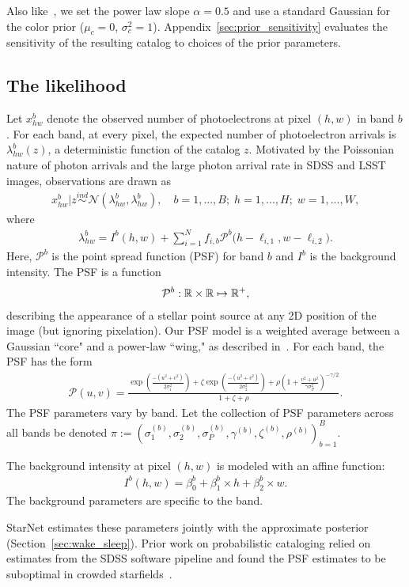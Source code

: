 Also like~\cite{Feder_2019}, we set the power law slope $\alpha = 0.5$ and use a standard Gaussian for the color prior ($\mu_c = 0$, $\sigma^2_c = 1$). 
Appendix~\ref{sec:prior_sensitivity} evaluates the 
sensitivity of the resulting catalog to choices of the prior parameters. 

\subsection{The likelihood}
Let $x_{hw}^b$ denote the observed number of photoelectrons at pixel $(h,w)$ in band $b$. 
For each band, at every pixel, the expected number of photoelectron arrivals is $\lambda^b_{hw}(z)$, a deterministic function of the catalog $z$. Motivated by the Poissonian nature of photon arrivals and 
the large photon arrival rate in SDSS and LSST images, 
observations are drawn as
\begin{align}
  x_{hw}^b | z \overset{ind}{\sim} \mathcal{N}(\lambda^b_{hw}, \lambda^b_{hw}),
  \quad 
  b = 1, ..., B; \;
  h = 1,..., H; \; 
  w = 1, ..., W, 
\end{align}
where 
\begin{align}
  \lambda^b_{hw} = I^{b}(h, w) + \sum_{i = 1}^N f_{i,b} \mathcal{P}^b\big(h - \ell_{i, 1}, w - \ell_{i, 2}\big).
  \label{eq:expected_intensity}
\end{align}
Here, $\mathcal{P}^b$ is the point spread function (PSF) for band $b$ and $I^{b}$ is the background intensity. The PSF is a function 
\begin{align}
\mathcal{P}^b : \mathbb{R} \times \mathbb{R} \mapsto \mathbb{R}^+,
\end{align}
describing the appearance of a stellar point source at any 2D position of the image (but ignoring pixelation). 
Our PSF model is a weighted average between a Gaussian ``core" and a power-law ``wing," as described in~\cite{Xin2018psf}. For each band, the PSF has the form
\begin{align}
    \mathcal{P}(u,v) = 
    \frac{\exp(\frac{-(u^2 + v^2)}{2\sigma_1^2}) + 
    \zeta \exp(\frac{-(u^2 + v^2)}{2\sigma_2^2}) + 
    \rho(1 + \frac{v^2 + u^2}{\gamma\sigma^2_P})^{-\gamma/2} }{1 + \zeta + \rho}.
\end{align}
The PSF parameters vary by band. Let the collection of PSF parameters across all bands be denoted $\pi := (\sigma_{1}^{(b)}, \sigma_{2}^{(b)}, \sigma_{P}^{(b)}, \gamma^{(b)}, \zeta^{(b)}, \rho^{(b)})_{b=1}^B$.

The background intensity at pixel $(h,w)$ is modeled with an affine function: 
\begin{align}
    I^{b}(h,w) = \beta_0^{b} + \beta_1^{b} \times h + \beta_2^{b} \times w.
\end{align}
The background parameters are specific to the band. 

StarNet estimates these parameters jointly with the approximate posterior (Section~\ref{sec:wake_sleep}). 
Prior work on probabilistic cataloging relied 
on estimates from the SDSS software pipeline and found the PSF estimates to be suboptimal in crowded starfields~\cite{Feder_2019}. 



